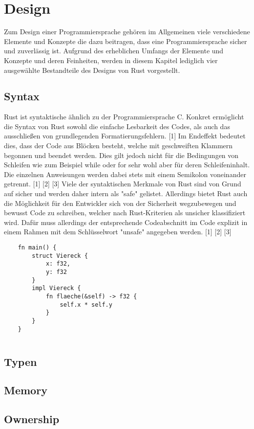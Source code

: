 \chapter{Design}
Zum Design einer Programmiersprache gehören im Allgemeinen viele verschiedene Elemente und Konzepte die dazu beitragen, dass eine Programmiersprache sicher und zuverlässig ist. Aufgrund des erheblichen Umfangs der Elemente und Konzepte und deren Feinheiten, werden in diesem Kapitel lediglich vier ausgewählte Bestandteile des Designs von Rust vorgestellt. \autocite{rust-wiki}
\section{Syntax}
Rust ist syntaktische ähnlich zu der Programmiersprache C. Konkret ermöglicht die Syntax von Rust sowohl die einfache Lesbarkeit des Codes, als auch das ausschließen von grundlegenden Formatierungsfehlern. [1]
Im Endeffekt bedeutet dies, dass der Code aus Blöcken besteht, welche mit geschweiften Klammern begonnen und beendet werden. Dies gilt jedoch nicht für die Bedingungen von Schleifen wie zum Beispiel while oder for sehr wohl aber für deren Schleifeninhalt. Die einzelnen Anweisungen werden dabei stets mit einem Semikolon voneinander getrennt.  [1] [2] [3]
Viele der syntaktischen Merkmale von Rust sind von Grund auf sicher und werden daher intern als "safe" gelistet. Allerdings bietet Rust auch die Möglichkeit für den Entwickler sich von der Sicherheit wegzubewegen und bewusst Code zu schreiben, welcher nach Rust-Kriterien als unsicher klassifiziert wird. Dafür muss allerdings der entsprechende Codeabschnitt im Code explizit in einem Rahmen mit dem Schlüsselwort "unsafe" angegeben werden. [1] [2] [3]
\newpage
\begin{verbatim}
    fn main() {
        struct Viereck {
            x: f32,
            y: f32
        }
        impl Viereck {
            fn flaeche(&self) -> f32 {
                self.x * self.y
            }
        }
    }
\end{verbatim}
\begin{lstlisting}[caption={Einfaches Struct und zugeh"orige Methode \\Quelle: \autocite{rust-wiki}}, label={lst:struct}]
\end{lstlisting}

\section{Typen}

\section{Memory}

\section{Ownership}